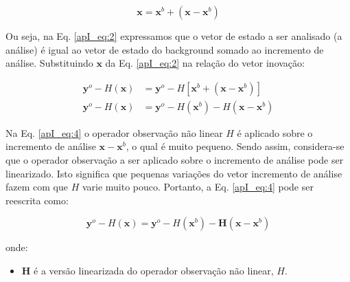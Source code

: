 \begin{equation}
  \label{apI_eq:2}
 \mathbf{x} = \mathbf{x}^{b} + (\mathbf{x} - \mathbf{x}^{b})
\end{equation}

Ou seja, na Eq. \ref{apI_eq:2} expressamos que o vetor de estado a ser analisado (a análise) é igual ao vetor de estado do background somado ao incremento de análise. Substituindo $\mathbf{x}$ da Eq. \ref{apI_eq:2} na relação do vetor inovação:



\begin{align}
  \label{apI_eq:3}
  \mathbf{y}^{o} - \textit{H}(\mathbf{x}) & = \mathbf{y}^{o} - \textit{H}[\mathbf{x}^{b} + (\mathbf{x} - \mathbf{x}^{b})] \\
  \label{apI_eq:4}
  \mathbf{y}^{o} - \textit{H}(\mathbf{x}) & = \mathbf{y}^{o} - \textit{H}(\mathbf{x}^{b}) - \textit{H}(\mathbf{x} - \mathbf{x}^{b})
\end{align}

Na Eq. \ref{apI_eq:4} o operador observação não linear $\textit{H}$ é aplicado sobre o incremento de análise $\mathbf{x} - \mathbf{x}^{b}$, o qual é muito pequeno. Sendo assim, considera-se que o operador observação a ser aplicado sobre o incremento de análise pode ser linearizado. Isto significa que pequenas variações do vetor incremento de análise fazem com que $\textit{H}$ varie muito pouco. Portanto, a Eq. \ref{apI_eq:4} pode ser reescrita como:

\begin{equation}
  \label{apI_eq:5}
  \mathbf{y}^{o} - \textit{H}(\mathbf{x}) = \mathbf{y}^{o} - \textit{H}(\mathbf{x}^{b}) - \mathbf{H}(\mathbf{x} - \mathbf{x}^{b})
\end{equation}

onde:

\begin{itemize}
  \item $\mathbf{H}$ é a versão linearizada do operador observação não linear, $\textit{H}$.
\end{itemize}

